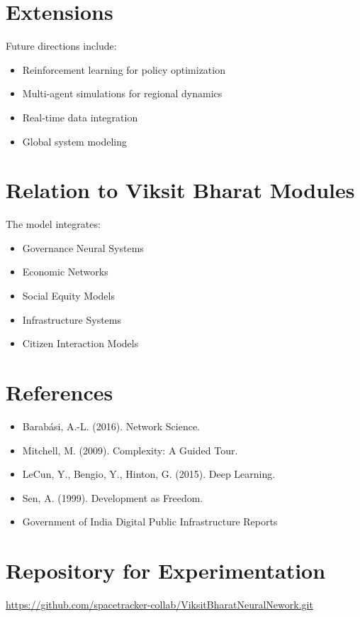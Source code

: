 \documentclass[12pt]{article}
\begin{document}
\section{Extensions}

Future directions include:

\begin{itemize}
\item Reinforcement learning for policy optimization
\item Multi-agent simulations for regional dynamics
\item Real-time data integration
\item Global system modeling
\end{itemize}

\section{Relation to Viksit Bharat Modules}

The model integrates:

\begin{itemize}
\item Governance Neural Systems
\item Economic Networks
\item Social Equity Models
\item Infrastructure Systems
\item Citizen Interaction Models
\end{itemize}

\section{References}

\begin{itemize}
\item Barabási, A.-L. (2016). Network Science.
\item Mitchell, M. (2009). Complexity: A Guided Tour.
\item LeCun, Y., Bengio, Y., Hinton, G. (2015). Deep Learning.
\item Sen, A. (1999). Development as Freedom.
\item Government of India Digital Public Infrastructure Reports
\end{itemize}

\section{Repository for Experimentation}

\noindent
\url{https://github.com/spacetracker-collab/ViksitBharatNeuralNework.git}
\end{document}

